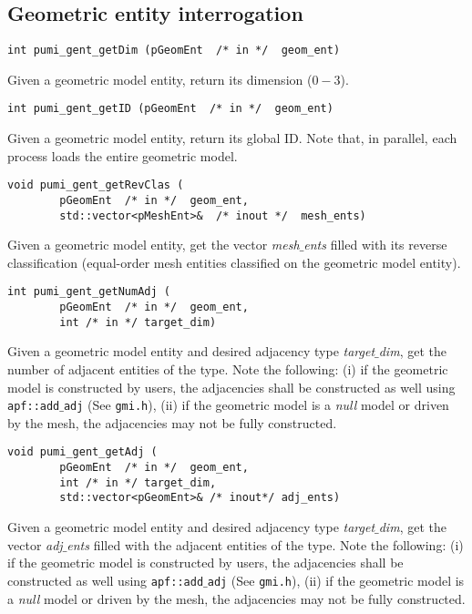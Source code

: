 \subsection{Geometric entity interrogation}

\begin{verbatim}
int pumi_gent_getDim (pGeomEnt  /* in */  geom_ent)
\end{verbatim}
\vspace{-.5cm}\hspace{1cm}
Given a geometric model entity, return its dimension ($0-3$).

\begin{verbatim}
int pumi_gent_getID (pGeomEnt  /* in */  geom_ent)
\end{verbatim}
\vspace{-.5cm}\hspace{1cm}
Given a geometric model entity, return its global ID. Note that, in parallel, each process loads the entire geometric model.

\begin{verbatim}
void pumi_gent_getRevClas (
        pGeomEnt  /* in */  geom_ent,
        std::vector<pMeshEnt>&  /* inout */  mesh_ents)
\end{verbatim}
\vspace{-.5cm}\hspace{1cm}
Given a geometric model entity, get the vector \emph{mesh$\_$ents} filled with its reverse classification (equal-order mesh entities classified on the geometric model entity).

\begin{verbatim}
int pumi_gent_getNumAdj (
        pGeomEnt  /* in */  geom_ent,
        int /* in */ target_dim)
\end{verbatim}
\vspace{-.5cm}\hspace{1cm}
        Given a geometric model entity and desired adjacency type \emph{target$\_$dim}, get the number of adjacent entities of the type. Note the following: (i) if the geometric model is constructed by users, the adjacencies shall be constructed as well using \texttt{apf::add$\_$adj} (See \texttt{gmi.h}), (ii) if the geometric model is a \emph{null} model or driven by the mesh, the adjacencies may not be fully constructed.

\begin{verbatim}
void pumi_gent_getAdj (
        pGeomEnt  /* in */  geom_ent,
        int /* in */ target_dim, 
        std::vector<pGeomEnt>& /* inout*/ adj_ents)
\end{verbatim}
\vspace{-.5cm}\hspace{1cm}
        Given a geometric model entity and desired adjacency type \emph{target$\_$dim}, get the vector \emph{adj$\_$ents} filled with the adjacent entities of the type. Note the following: (i) if the geometric model is constructed by users, the adjacencies shall be constructed as well using \texttt{apf::add$\_$adj} (See \texttt{gmi.h}), (ii) if the geometric model is a \emph{null} model or driven by the mesh, the adjacencies may not be fully constructed.

